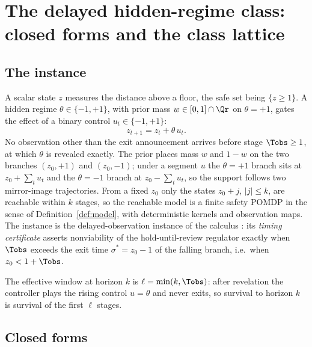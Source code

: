 \section{The delayed hidden-regime class: closed forms and the class lattice}\label{sec:delayed}

\subsection{The instance}

A scalar state $z$ measures the distance above a floor, the safe set being $\{z\ge1\}$. A hidden regime $\theta\in\{-1,+1\}$, with prior mass $w\in[0,1]\cap\Qr$ on $\theta=+1$, gates the effect of a binary control $u_t\in\{-1,+1\}$:
\begin{equation}\label{eq:delayed}
z_{t+1}=z_t+\theta\,u_t .
\end{equation}
No observation other than the exit announcement arrives before stage $\Tobs\ge1$, at which $\theta$ is revealed exactly. The prior places mass $w$ and $1-w$ on the two branches $(z_0,+1)$ and $(z_0,-1)$; under a segment $u$ the $\theta=+1$ branch sits at $z_0+\sum_t u_t$ and the $\theta=-1$ branch at $z_0-\sum_t u_t$, so the support follows two mirror-image trajectories. From a fixed $z_0$ only the states $z_0+j$, $|j|\le k$, are reachable within $k$ stages, so the reachable model is a finite safety POMDP in the sense of Definition~\ref{def:model}, with deterministic kernels and observation maps. The instance is the delayed-observation instance of the calculus \cite{Abaee2026calc}: its \emph{timing certificate} asserts nonviability of the hold-until-review regulator exactly when $\Tobs$ exceeds the exit time $\sigma^{*}=z_0-1$ of the falling branch, i.e.\ when $z_0<1+\Tobs$.

The effective window at horizon $k$ is $\ell=\min(k,\Tobs)$: after revelation the controller plays the rising control $u=\theta$ and never exits, so survival to horizon $k$ is survival of the first $\ell$ stages.

\subsection{Closed forms}

